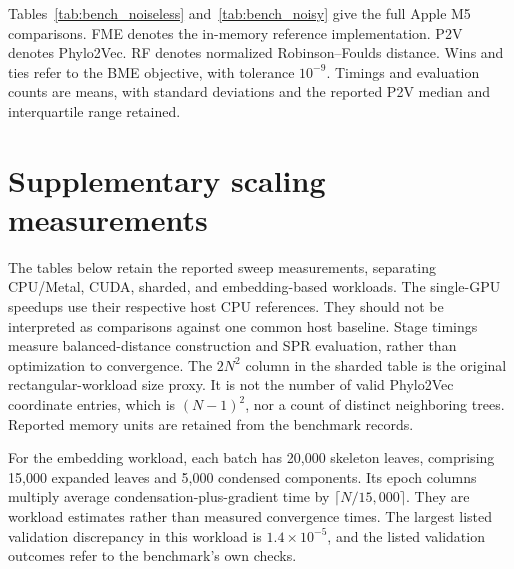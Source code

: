 Tables~\ref{tab:bench_noiseless} and~\ref{tab:bench_noisy} give the full Apple M5 comparisons.
FME denotes the in-memory reference implementation.
P2V denotes Phylo2Vec.
RF denotes normalized Robinson--Foulds distance.
Wins and ties refer to the BME objective, with tolerance $10^{-9}$.
Timings and evaluation counts are means, with standard deviations and the reported P2V median and interquartile range retained.



\clearpage
\section{Supplementary scaling measurements}
\label{sec:scaling_tables}

The tables below retain the reported sweep measurements, separating CPU/Metal, CUDA, sharded, and embedding-based workloads.
The single-GPU speedups use their respective host CPU references.
They should not be interpreted as comparisons against one common host baseline.
Stage timings measure balanced-distance construction and SPR evaluation, rather than optimization to convergence.
The $2N^2$ column in the sharded table is the original rectangular-workload size proxy.
It is not the number of valid Phylo2Vec coordinate entries, which is $(N-1)^2$, nor a count of distinct neighboring trees.
Reported memory units are retained from the benchmark records.

For the embedding workload, each batch has 20,000 skeleton leaves, comprising 15,000 expanded leaves and 5,000 condensed components.
Its epoch columns multiply average condensation-plus-gradient time by
$\lceil N/15{,}000\rceil$.
They are workload estimates rather than measured convergence times.
The largest listed validation discrepancy in this workload is $1.4\times10^{-5}$, and the listed validation outcomes refer to the benchmark's own checks.


